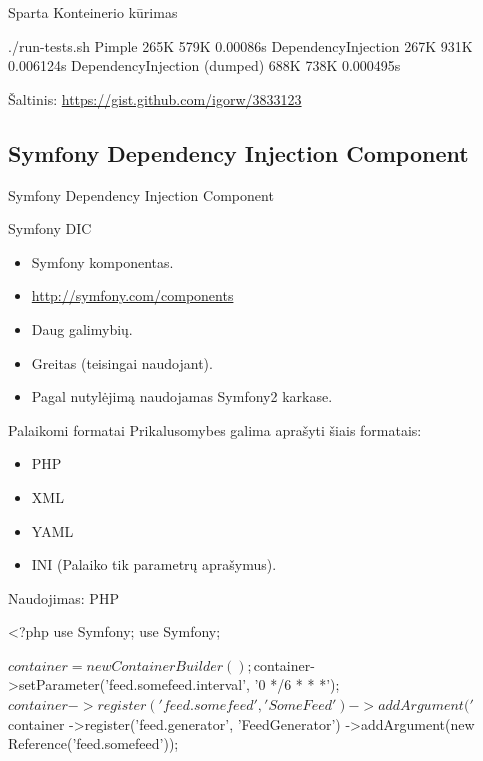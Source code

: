 \documentclass[12pt,a4paper]{beamer}
\begin{document}
\begin{frame}[fragile]{Sparta}
    Konteinerio kūrimas
    \vskip0.5cm
\begin{bashcode}
    ./run-tests.sh 
    Pimple
    265K
    579K
    0.00086s
    DependencyInjection
    267K
    931K
    0.006124s
    DependencyInjection (dumped)
    688K
    738K
    0.000495s
\end{bashcode}
    \vskip0.25cm
    \scriptsize{Šaltinis: \url{https://gist.github.com/igorw/3833123}}
\end{frame}


\subsection{Symfony Dependency Injection Component}
\begin{frame}
	\begin{center}
        {\Huge Symfony Dependency Injection Component}
	\end{center}
\end{frame}

\begin{frame}{Symfony DIC}
    \begin{itemize}
        \item Symfony komponentas.
        \item \url{http://symfony.com/components}
        \item Daug galimybių.
        \item Greitas (teisingai naudojant).
        \item Pagal nutylėjimą naudojamas Symfony2 karkase.
    \end{itemize}
\end{frame}

\begin{frame}{Palaikomi formatai}
    Prikalusomybes galima aprašyti šiais formatais:
    \begin{itemize}
        \item PHP
        \item XML
        \item YAML
        \item INI (Palaiko tik parametrų aprašymus).
    \end{itemize}
\end{frame}

\begin{frame}[fragile]{Naudojimas: PHP}
\begin{phpcode}
    <?php
    use Symfony\Component\DependencyInjection\ContainerBuilder;
    use Symfony\Component\DependencyInjection\Reference;

    $container = new ContainerBuilder();

    $container->setParameter('feed.somefeed.interval', '0 */6 * * *');
    $container
        ->register('feed.somefeed', 'SomeFeed')
        ->addArgument('%

    $container
        ->register('feed.generator', 'FeedGenerator')
        ->addArgument(new Reference('feed.somefeed'));
\end{phpcode}
\end{frame}
\end{document}
